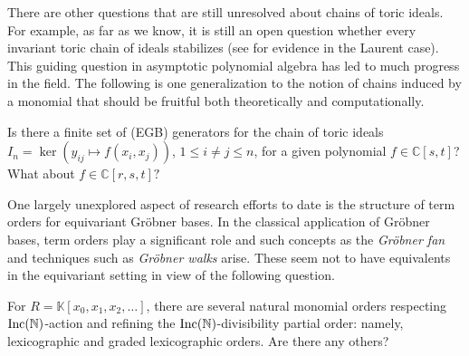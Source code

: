 
There are other questions that are still unresolved about chains of toric ideals.  For example, as far as we know, it is still an open question whether every invariant toric chain of ideals stabilizes (see \cite{Hillar13} for evidence in the Laurent case).  This guiding question in asymptotic polynomial algebra has led to much progress in the field.  The following is one generalization to the notion of chains induced by a monomial that should be fruitful both theoretically and computationally.

\begin{problem}
Is there a finite set of (EGB) generators for the chain of toric ideals $I_n = \ker(y_{ij} \mapsto f(x_i,x_j))$, $1 \leq i \neq j \leq n$, for a given polynomial $f \in \mathbb C[s,t]$?  What about $f \in \mathbb C[r, s,t]?$
\end{problem}

One largely unexplored aspect of research efforts to date is the structure of term orders for equivariant Gr\"obner bases.  In the classical application of Gr\"obner bases, term orders play a significant role and such concepts as the \emph{Gr\"obner fan} and techniques such as \emph{Gr\"obner walks} arise. These seem not to have equivalents in the equivariant setting in view of the following question.  

\begin{question} For $R = \mathbb K[x_0,x_1,x_2,\ldots]$, there are several natural monomial orders respecting $\operatorname{Inc}(\mathbb N)$-action and refining the $\operatorname{Inc}(\mathbb N)$-divisibility partial order: namely, lexicographic and graded lexicographic orders.  Are there any others?
\end{question}



